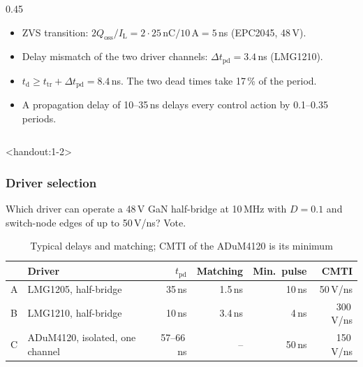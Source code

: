 \begin{frame}
\begin{columns}[T]
\begin{column}{0.45\textwidth}
\begin{itemize}
				\item ZVS transition: $2Q_\mathrm{oss}/I_\mathrm{L}=2\cdot25\,\mathrm{nC}/10\,\mathrm{A}=5$\,ns (EPC2045, 48\,V).
				\item Delay mismatch of the two driver channels: $\Delta t_\mathrm{pd}=3.4$\,ns (LMG1210).
				\item $t_\mathrm{d}\geq t_\mathrm{tr}+\Delta t_\mathrm{pd}=8.4$\,ns. The two dead times take 17\,\% of the period.
				\item A propagation delay of 10--35\,ns delays every control action by 0.1--0.35 periods.
			\end{itemize}
		\end{column}
	\end{columns}
\end{frame}

\begin{frame}<handout:1-2>
	\frametitle{Driver selection}
	Which driver can operate a 48\,V GaN half-bridge at 10\,MHz with $D=0.1$ and switch-node edges of up to 50\,V/ns? Vote.
	\begin{table}
		\centering
		\small
		\begin{tabular}{|l|l|r|r|r|r|}
			\hline
			  & \textbf{Driver}                          & \textbf{$t_\mathrm{pd}$} & \textbf{Matching} & \textbf{Min.\ pulse} & \textbf{CMTI} \\
			\hline
			A & LMG1205, half-bridge                     & 35\,ns                   & 1.5\,ns           & 10\,ns               & 50\,V/ns      \\
			B & LMG1210, half-bridge                     & 10\,ns                   & 3.4\,ns           & 4\,ns                & 300\,V/ns     \\
			C & ADuM4120, isolated, one channel          & 57--66\,ns               & --                & 50\,ns               & 150\,V/ns     \\
			\hline
		\end{tabular}
		\caption{Typical delays and matching; CMTI of the ADuM4120 is its minimum}
	\end{table}
\end{frame}

